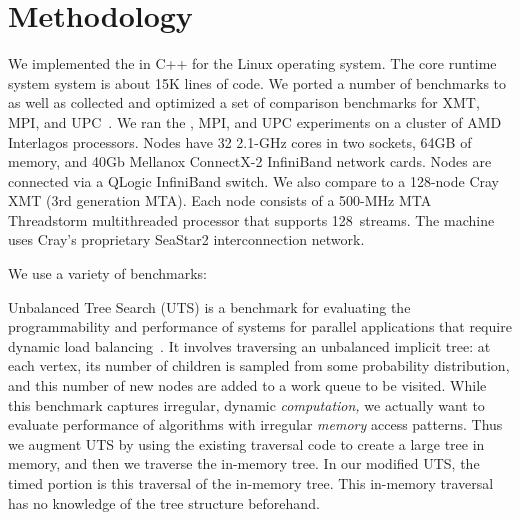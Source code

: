 \section{Methodology} \label{sec:method}

We implemented the \Grappa in C++ for the Linux operating system. The core
runtime system system is about 15K lines of code. We ported a number of
benchmarks to \Grappa as well as collected and optimized a set of comparison
benchmarks for XMT, MPI, and UPC~\cite{UPC}. We ran the \Grappa, MPI, and UPC
experiments on a cluster of AMD Interlagos processors. Nodes have 32 2.1-GHz
cores in two sockets, 64GB of memory, and 40Gb Mellanox ConnectX-2 InfiniBand
network cards. Nodes are connected via a QLogic InfiniBand switch. We also
compare \Grappa to a 128-node Cray XMT (3rd generation MTA). Each node
consists of a 500-MHz MTA Threadstorm multithreaded processor that supports
128~streams. The machine uses Cray's proprietary SeaStar2 interconnection
network. 

We use a variety of benchmarks:

% 

\vspace{0.5ex}
 Unbalanced Tree Search
(UTS) is a benchmark for evaluating the programmability and performance of
systems for parallel applications that require dynamic load
balancing~\cite{UTS}. It involves traversing an unbalanced implicit tree: at
each vertex, its number of children is sampled from some probability
distribution, and this number of new nodes are added to a work queue to be
visited. While this benchmark captures irregular, dynamic \emph{computation,}
we actually want to evaluate performance of algorithms with irregular
\emph{memory\/} access patterns. Thus we augment UTS by using the existing
traversal code to create a large tree in memory, and then we traverse the
in-memory tree. In our modified UTS, the timed portion is this
traversal of the in-memory tree. This in-memory traversal has no knowledge of
the tree structure beforehand.

